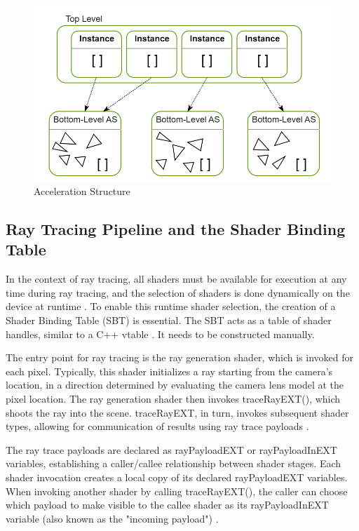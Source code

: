 \documentclass[conference]{IEEEtran}
\begin{document}
\begin{figure}[h]
    \centering
    \includegraphics[scale=0.45]{figures/AccelerationStructure.png}
    \caption{Acceleration Structure \cite{NVIDIA_Vulkan_Ray_Tracing_Tutorial}}
    \label{acceleration_structure}
\end{figure}

\subsection{Ray Tracing Pipeline and the Shader Binding Table}
In the context of ray tracing, all shaders must be available for execution at any time during ray tracing, and the selection of shaders is done dynamically on the device at runtime \cite{NVIDIA_Vulkan_Ray_Tracing_Tutorial}. To enable this runtime shader selection, the creation of a Shader Binding Table (SBT) is essential. The SBT acts as a table of shader handles, similar to a C++ vtable \cite{NVIDIA_Vulkan_Ray_Tracing_Tutorial}. It needs to be constructed manually.

The entry point for ray tracing is the ray generation shader, which is invoked for each pixel. Typically, this shader initializes a ray starting from the camera's location, in a direction determined by evaluating the camera lens model at the pixel location. The ray generation shader then invokes traceRayEXT(), which shoots the ray into the scene. traceRayEXT, in turn, invokes subsequent shader types, allowing for communication of results using ray trace payloads \cite{NVIDIA_Vulkan_Ray_Tracing_Tutorial}.

The ray trace payloads are declared as rayPayloadEXT or rayPayloadInEXT variables, establishing a caller/callee relationship between shader stages. Each shader invocation creates a local copy of its declared rayPayloadEXT variables. When invoking another shader by calling traceRayEXT(), the caller can choose which payload to make visible to the callee shader as its rayPayloadInEXT variable (also known as the "incoming payload") \cite{NVIDIA_Vulkan_Ray_Tracing_Tutorial}.
\end{document}
